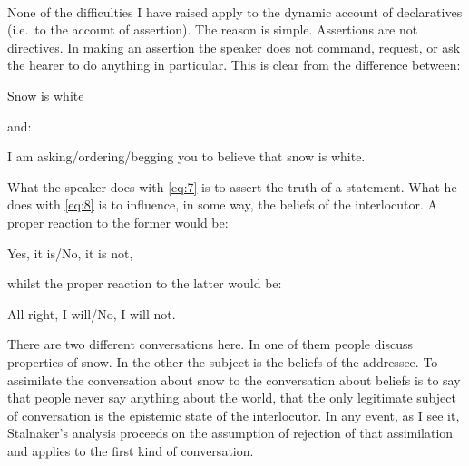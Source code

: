 \paragraph{}
None of the difficulties I have raised apply to the dynamic account of declaratives (i.e.\ to the account of assertion). The reason is simple. Assertions are not directives. In making an assertion the speaker does not command, request, or ask the hearer to do anything in particular. This is clear from the difference between:
\begin{eqclaim}\label{eq:7}
  Snow is white
\end{eqclaim}
and:
\begin{eqclaim}\label{eq:8}
  I am asking/ordering/begging you to believe that snow is white.
\end{eqclaim}
What the speaker does with \eqref{eq:7} is to assert the truth of a statement. What he does with \eqref{eq:8} is to influence, in some way, the beliefs of the interlocutor. A proper reaction to the former would be:
\begin{eqclaim}
  Yes, it is/No, it is not,
\end{eqclaim}
whilst the proper reaction to the latter would be:
\begin{eqclaim}
  All right, I will/No, I will not.
\end{eqclaim}
There are two different conversations here. In one of them people discuss properties of snow. In the other the subject is the beliefs of the addressee. To assimilate the conversation about snow to the conversation about beliefs is to say that people never say anything about the world, that the only legitimate subject of conversation is the epistemic state of the interlocutor. In any event, as I see it, Stalnaker's analysis proceeds on the assumption of rejection of that assimilation and applies to the first kind of conversation.

\endinput

